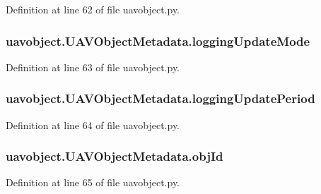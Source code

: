 Definition at line 62 of file uavobject.\-py.

\hypertarget{classuavobject_1_1_u_a_v_object_metadata_a1eb245c4c691dcf5bd245d13c76b10e2}{
\subsubsection[{logging\-Update\-Mode}]{\setlength{\rightskip}{0pt plus 5cm}uavobject.\-U\-A\-V\-Object\-Metadata.\-logging\-Update\-Mode}}\label{classuavobject_1_1_u_a_v_object_metadata_a1eb245c4c691dcf5bd245d13c76b10e2}


Definition at line 63 of file uavobject.\-py.

\hypertarget{classuavobject_1_1_u_a_v_object_metadata_a42d69560bb4cd54063892f566a7d4b1d}{
\subsubsection[{logging\-Update\-Period}]{\setlength{\rightskip}{0pt plus 5cm}uavobject.\-U\-A\-V\-Object\-Metadata.\-logging\-Update\-Period}}\label{classuavobject_1_1_u_a_v_object_metadata_a42d69560bb4cd54063892f566a7d4b1d}


Definition at line 64 of file uavobject.\-py.

\hypertarget{classuavobject_1_1_u_a_v_object_metadata_afdb35886b9b80c3d0c14039310ab7023}{
\subsubsection[{obj\-Id}]{\setlength{\rightskip}{0pt plus 5cm}uavobject.\-U\-A\-V\-Object\-Metadata.\-obj\-Id}}\label{classuavobject_1_1_u_a_v_object_metadata_afdb35886b9b80c3d0c14039310ab7023}


Definition at line 65 of file uavobject.\-py.

